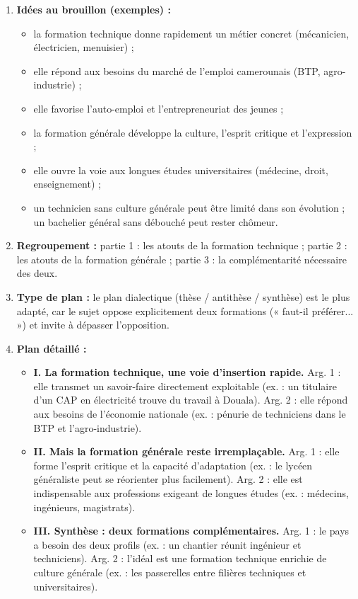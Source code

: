 \documentclass[11pt]{article}
\newcommand{\cle}[1]{{\popxbold\color{popdark}#1}}
\newcounter{popsec}
\newcounter{popsub}
\newcommand{\courssub}[1]{%
  \stepcounter{popsub}%
  \par\vspace{9pt}\noindent{\popxbold\fontsize{11.5}{13}\selectfont\color{popink}{\color{poporange}\thepopsec.\thepopsub}\hspace{6pt}#1}\par\nopagebreak\vspace{4pt}
}
\begin{document}
\courssub{Exercice 8 — Recherche d'idées et plan}
\begin{corrige}
\begin{enumerate}
\item \textbf{Idées au brouillon (exemples) :}
\begin{itemize}
\item la formation technique donne rapidement un métier concret (mécanicien, électricien, menuisier) ;
\item elle répond aux besoins du marché de l'emploi camerounais (BTP, agro-industrie) ;
\item elle favorise l'auto-emploi et l'entrepreneuriat des jeunes ;
\item la formation générale développe la culture, l'esprit critique et l'expression ;
\item elle ouvre la voie aux longues études universitaires (médecine, droit, enseignement) ;
\item un technicien sans culture générale peut être limité dans son évolution ; un bachelier général sans débouché peut rester chômeur.
\end{itemize}
\item \textbf{Regroupement :} partie 1 : les atouts de la formation technique ; partie 2 : les atouts de la formation générale ; partie 3 : la complémentarité nécessaire des deux.
\item \textbf{Type de plan :} le plan \cle{dialectique} (thèse / antithèse / synthèse) est le plus adapté, car le sujet oppose explicitement deux formations (« faut-il préférer... ») et invite à dépasser l'opposition.
\item \textbf{Plan détaillé :}
\begin{itemize}
\item \textbf{I. La formation technique, une voie d'insertion rapide.} Arg. 1 : elle transmet un savoir-faire directement exploitable (ex. : un titulaire d'un CAP en électricité trouve du travail à Douala). Arg. 2 : elle répond aux besoins de l'économie nationale (ex. : pénurie de techniciens dans le BTP et l'agro-industrie).
\item \textbf{II. Mais la formation générale reste irremplaçable.} Arg. 1 : elle forme l'esprit critique et la capacité d'adaptation (ex. : le lycéen généraliste peut se réorienter plus facilement). Arg. 2 : elle est indispensable aux professions exigeant de longues études (ex. : médecins, ingénieurs, magistrats).
\item \textbf{III. Synthèse : deux formations complémentaires.} Arg. 1 : le pays a besoin des deux profils (ex. : un chantier réunit ingénieur et techniciens). Arg. 2 : l'idéal est une formation technique enrichie de culture générale (ex. : les passerelles entre filières techniques et universitaires).
\end{itemize}
\end{enumerate}
\end{corrige}
\end{document}
